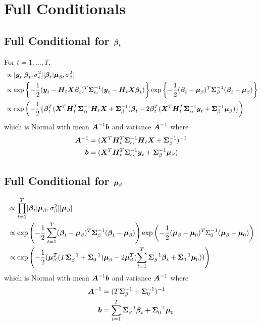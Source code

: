 \documentclass[fleqn]{article}
\def\bm#1{\mbox{\boldmath $#1$}}
\begin{document}
\section{Full Conditionals}
%
\subsection{Full Conditional for $\bm{\beta}_t$}
%
For $t = 1, \ldots, T$,
\begin{align*}
[\bm{\beta}_t | \cdot] & \propto [\bm{y}_t | \bm{\beta}_t, \sigma^2_\epsilon] [\bm{\beta}_t | \bm{\mu}_\beta, \sigma^2_\beta]\\
%
& \propto \exp{ \left\{ - \frac{1} {2} (\bm{y}_t - \bm{H}_t \bm{X} \bm{\beta}_t)^T \bm{\Sigma}_{\epsilon_t}^{ - 1} (\bm{y}_t - \bm{H}_t \bm{X} \bm{\beta}_t) \right\} } \exp{ \left\{ - \frac{1} {2} (\bm{\beta}_t - \bm{\mu}_\beta)^T \bm{\Sigma}_\beta^{ - 1} (\bm{\beta}_t - \bm{\mu}_\beta) \right\}}\\
%
& \propto \exp{\left( - \frac{1} {2} \{\bm{\beta}_t^T (\bm{X}^T \bm{H}_t^T \bm{\Sigma}_{\epsilon_t}^{ - 1} \bm{H}_t \bm{X} + \bm{\Sigma}_\beta^{ - 1}) \bm{\beta}_t - 2 \bm{\beta}_t^T (\bm{X}^T \bm{H}_t^T \bm{\Sigma}_{\epsilon_t}^{ - 1} \bm{y}_t + \bm{\Sigma}_\beta^{ - 1} \bm{\mu}_\beta) \} \right) }
\end{align*}
%
which is Normal with mean $ \bm{A}^{ - 1} \bm{b}$ and variance $\bm{A}^{ - 1}$ where
\begin{align*}
  \bm{A}^{ - 1} & = (\bm{X}^T \bm{H}_t^T \bm{\Sigma}_{\epsilon_t}^{ - 1} \bm{H}_t \bm{X} + \bm{\Sigma}_\beta^{ - 1})^{ - 1}\\
  \bm{b} & = (\bm{X}^T \bm{H}_t^T \bm{\Sigma}_{\epsilon_t}^{ - 1} \bm{y}_t + \bm{\Sigma}_\beta^{ - 1} \bm{\mu}_\beta)\\
\end{align*}
%
\subsection{Full Conditional for $\bm{\mu}_\beta$}
%
\begin{align*}
[\bm{\mu}_\beta | \cdot] & \propto \prod_{t = 1}^T [\bm{\beta}_t | \bm{\mu}_\beta, \sigma^2_\beta] [\bm{\mu}_\beta]\\
%
& \propto \exp{ \left( - \frac{1} {2} \sum_{t = 1}^T (\bm{\beta}_t - \bm{\mu}_\beta)^T \bm{\Sigma}_\beta^{ - 1} (\bm{\beta}_t - \bm{\mu}_\beta) \right) } \exp{ \left( - \frac{1} {2} (\bm{\mu}_\beta - \bm{\mu}_0)^T \Sigma_0^{ - 1} (\bm{\mu}_\beta - \bm{\mu}_0) \right)}\\
%
& \propto \exp{ \left( - \frac{1} {2} (\bm{\mu}_\beta^T (T \bm{\Sigma}_\beta^{ - 1} + \bm{\Sigma}_0^{ - 1}) \bm{\mu}_\beta - 2 \bm{\mu}_\beta^T (\sum_{t = 1}^T \bm{\Sigma}_\beta^{ - 1} \bm{\beta}_t + \bm{\Sigma}_0^{ - 1} \bm{\mu}_0) ) \right) }
\end{align*}
%
which is Normal with mean $ \bm{A}^{ - 1} \bm{b}$ and variance $\bm{A}^{ - 1}$ where
\begin{align*}
  \bm{A}^{ - 1} & = (T \bm{\Sigma}_\beta^{ - 1} + \bm{\Sigma}_0^{ - 1})^{ - 1}\\
  \bm{b} & = \sum_{t = 1}^T \bm{\Sigma}_\beta^{ - 1} \bm{\beta}_t + \bm{\Sigma}_0^{ - 1} \bm{\mu}_0\\
\end{align*}
%
\end{document}
